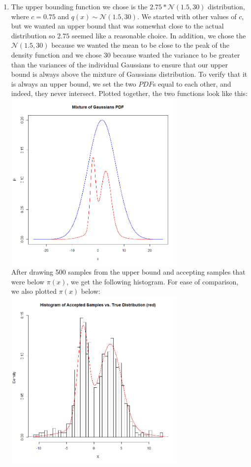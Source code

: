 \documentclass[12pt,letterpaper]{article}
\begin{document}
\begin{enumerate}[label={(\alph*) }]
                \item The upper bounding function we chose is the $2.75* \mathcal{N}(1.5,30)$ distribution, where $c=0.75$ and $q(x)\sim\mathcal{N}(1.5,30) $. We started with other values of $c$, but we wanted an upper bound that was somewhat close to the actual distribution so $2.75$ seemed like a reasonable choice.
In addition, we chose the $\mathcal{N}(1.5,30)$ because we wanted the mean to be close to the peak of the density function and we chose 30 because wanted the variance to be greater than the variances of the individual Gaussians to ensure that our upper bound is always above the mixture of Gaussians distribution. To verify that it is always an upper bound, we set the two $PDF$s equal to each other, and indeed, they never intersect. Plotted together, the two functions look like this: \\
        \includegraphics[width=3.5in]{3c_upper_lower.png} \\
        
        After drawing 500 samples from the upper bound and accepting samples that were below $\pi(x)$, we get the following histogram. For ease of comparison, we also plotted $\pi(x)$ below: \\
        \includegraphics[width=3.5in]{3c_accepted_true.png}\\
        

\end{enumerate}
\end{document}
